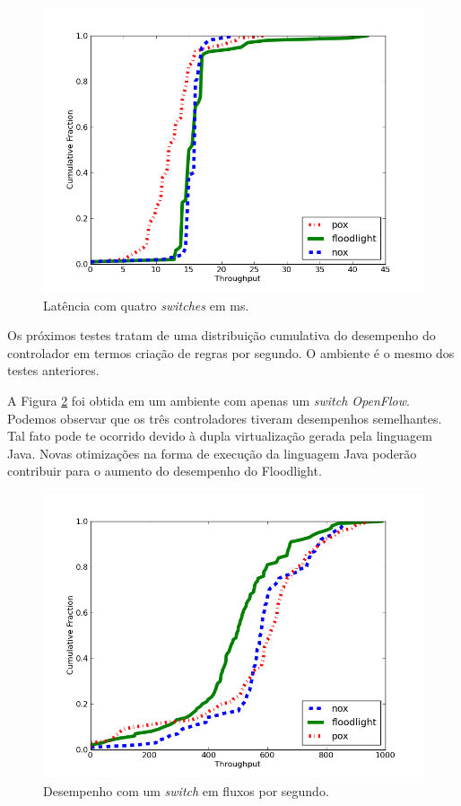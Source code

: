 \begin{figure}[h]
\centering
\includegraphics[width=140mm]{latencia_4sw.png}
\caption{Latência com quatro \textit{switches} em ms.}
\label{fig:latencia4sw} 
\end{figure}

Os próximos testes tratam de uma distribuição cumulativa do
desempenho do controlador em termos criação de regras por
segundo. O ambiente é o mesmo dos testes anteriores.

A Figura \ref{fig:desempenho1sw} foi obtida em um ambiente
com apenas um \textit{switch OpenFlow}. Podemos observar 
que os três controladores tiveram desempenhos semelhantes.
Tal fato pode te ocorrido devido à dupla virtualização gerada
pela linguagem Java. Novas otimizações na forma de execução
da linguagem Java poderão contribuir para o aumento do 
desempenho do Floodlight.

\begin{figure}[h]
\centering
\includegraphics[width=140mm]{desempenho_1sw.png}
\caption{Desempenho com um \textit{switch} em fluxos por segundo.}
\label{fig:desempenho1sw} 
\end{figure}


